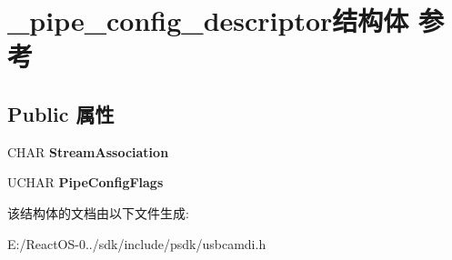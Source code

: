 \hypertarget{struct__pipe__config__descriptor}{}\section{\+\_\+pipe\+\_\+config\+\_\+descriptor结构体 参考}
\label{struct__pipe__config__descriptor}
\subsection*{Public 属性}
\begin{DoxyCompactItemize}
\item 
\mbox{\label{struct__pipe__config__descriptor_acfdb9ac9dc15c5df0be33e7da154e181}} 
C\+H\+AR {\bfseries Stream\+Association}
\item 
\mbox{\label{struct__pipe__config__descriptor_aa44788ad45a5569724d0090886245218}} 
U\+C\+H\+AR {\bfseries Pipe\+Config\+Flags}
\end{DoxyCompactItemize}


该结构体的文档由以下文件生成\+:\begin{DoxyCompactItemize}
\item 
E\+:/\+React\+O\+S-\/0../sdk/include/psdk/usbcamdi.\+h\end{DoxyCompactItemize}
